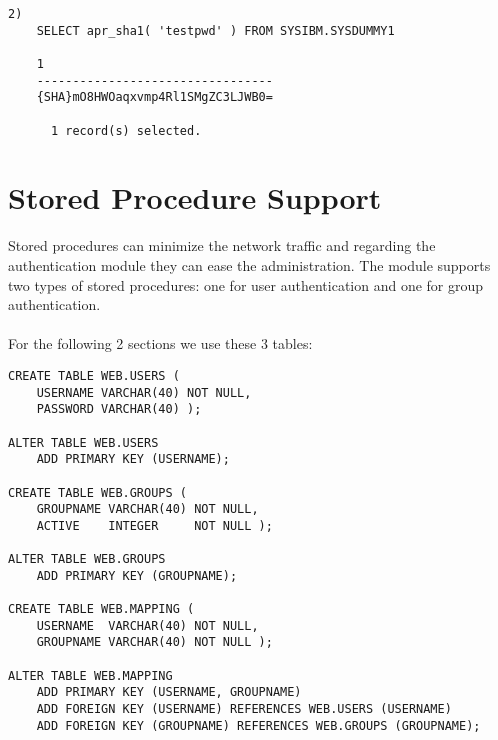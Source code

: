 \documentclass[11pt,a4paper]{article}
\begin{document}
\begin{appendix}
\begin{verbatim}
2)
    SELECT apr_sha1( 'testpwd' ) FROM SYSIBM.SYSDUMMY1

    1
    ---------------------------------
    {SHA}mO8HWOaqxvmp4Rl1SMgZC3LJWB0=

      1 record(s) selected.
\end{verbatim}
\newpage
\hypertarget{hsps}{}
\section{Stored Procedure Support} \label{sp}
Stored procedures can minimize the network traffic and regarding the authentication module they can ease the administration. The module supports two types of stored procedures: one for user authentication and one for group authentication.\\
\\
For the following 2 sections we use these 3 tables:
\\
\begin{verbatim}
CREATE TABLE WEB.USERS (
    USERNAME VARCHAR(40) NOT NULL,
    PASSWORD VARCHAR(40) );

ALTER TABLE WEB.USERS
    ADD PRIMARY KEY (USERNAME);

CREATE TABLE WEB.GROUPS (
    GROUPNAME VARCHAR(40) NOT NULL,
    ACTIVE    INTEGER     NOT NULL );

ALTER TABLE WEB.GROUPS
    ADD PRIMARY KEY (GROUPNAME);

CREATE TABLE WEB.MAPPING (
    USERNAME  VARCHAR(40) NOT NULL,
    GROUPNAME VARCHAR(40) NOT NULL );

ALTER TABLE WEB.MAPPING
    ADD PRIMARY KEY (USERNAME, GROUPNAME)
    ADD FOREIGN KEY (USERNAME) REFERENCES WEB.USERS (USERNAME)
    ADD FOREIGN KEY (GROUPNAME) REFERENCES WEB.GROUPS (GROUPNAME);
\end{verbatim}
\newpage
\hypertarget{husersp}{}

\end{appendix}
\end{document}
